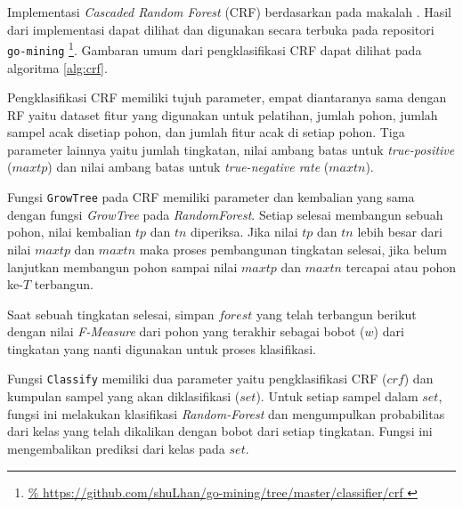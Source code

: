 Implementasi \textit{Cascaded Random Forest} (CRF) berdasarkan pada makalah
\textcite{baumann2013cascaded}.
Hasil dari implementasi dapat dilihat dan digunakan secara terbuka pada
repositori \texttt{go-mining}
\footnote{
\url{%
https://github.com/shuLhan/go-mining/tree/master/classifier/crf
}}.
Gambaran umum dari pengklasifikasi CRF dapat dilihat pada algoritma
\ref{alg:crf}.

Pengklasifikasi CRF memiliki tujuh parameter, empat diantaranya sama dengan RF
yaitu dataset fitur yang digunakan untuk pelatihan, jumlah pohon, jumlah sampel
acak disetiap pohon, dan jumlah fitur acak di setiap pohon.
Tiga parameter lainnya yaitu jumlah tingkatan, nilai ambang batas untuk
\textit{true-positive} ($maxtp$) dan nilai ambang batas untuk
\textit{true-negative rate} ($maxtn$).

	

Fungsi \texttt{GrowTree} pada CRF memiliki parameter dan kembalian yang sama
dengan fungsi \textit{GrowTree} pada \textit{RandomForest}.
Setiap selesai membangun sebuah pohon, nilai kembalian $tp$ dan $tn$ diperiksa.
Jika nilai $tp$ dan $tn$ lebih besar dari nilai $maxtp$ dan $maxtn$ maka proses
pembangunan tingkatan selesai, jika belum lanjutkan membangun pohon sampai
nilai $maxtp$ dan $maxtn$ tercapai atau pohon ke-$T$ terbangun.

Saat sebuah tingkatan selesai, simpan $forest$ yang telah terbangun berikut
dengan nilai \textit{F-Measure} dari pohon yang terakhir sebagai bobot ($w$)
dari tingkatan yang nanti digunakan untuk proses klasifikasi.

Fungsi \texttt{Classify} memiliki dua parameter yaitu pengklasifikasi CRF
($crf$) dan kumpulan sampel yang akan diklasifikasi ($set$).
Untuk setiap sampel dalam $set$, fungsi ini melakukan klasifikasi
\textit{Random-Forest} dan mengumpulkan probabilitas dari kelas yang telah
dikalikan dengan bobot dari setiap tingkatan.
Fungsi ini mengembalikan prediksi dari kelas pada $set$.
